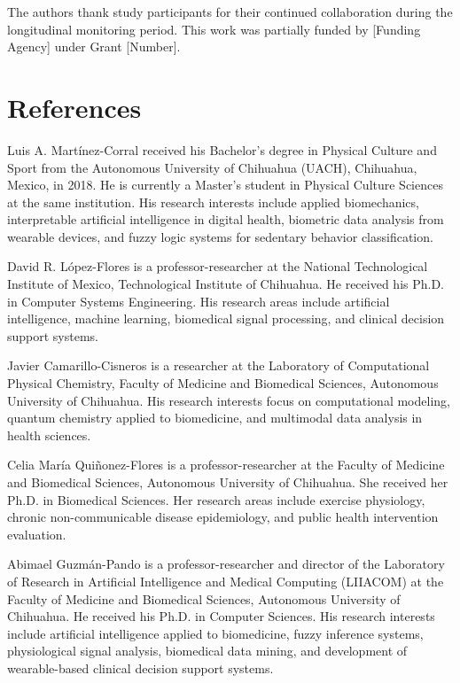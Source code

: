 \documentclass[journal,twoside,web]{ieeecolor}
\begin{document}
The authors thank study participants for their continued collaboration during the longitudinal monitoring period. This work was partially funded by [Funding Agency] under Grant [Number].

\section*{References}




\begin{IEEEbiographynophoto}{Luis A. Martínez-Corral} received his Bachelor's degree in Physical Culture and Sport from the Autonomous University of Chihuahua (UACH), Chihuahua, Mexico, in 2018. He is currently a Master's student in Physical Culture Sciences at the same institution. His research interests include applied biomechanics, interpretable artificial intelligence in digital health, biometric data analysis from wearable devices, and fuzzy logic systems for sedentary behavior classification.
\end{IEEEbiographynophoto}

\begin{IEEEbiographynophoto}{David R. López-Flores} is a professor-researcher at the National Technological Institute of Mexico, Technological Institute of Chihuahua. He received his Ph.D. in Computer Systems Engineering. His research areas include artificial intelligence, machine learning, biomedical signal processing, and clinical decision support systems.
\end{IEEEbiographynophoto}

\begin{IEEEbiographynophoto}{Javier Camarillo-Cisneros} is a researcher at the Laboratory of Computational Physical Chemistry, Faculty of Medicine and Biomedical Sciences, Autonomous University of Chihuahua. His research interests focus on computational modeling, quantum chemistry applied to biomedicine, and multimodal data analysis in health sciences.
\end{IEEEbiographynophoto}

\begin{IEEEbiographynophoto}{Celia María Quiñonez-Flores} is a professor-researcher at the Faculty of Medicine and Biomedical Sciences, Autonomous University of Chihuahua. She received her Ph.D. in Biomedical Sciences. Her research areas include exercise physiology, chronic non-communicable disease epidemiology, and public health intervention evaluation.
\end{IEEEbiographynophoto}

\begin{IEEEbiographynophoto}{Abimael Guzmán-Pando} is a professor-researcher and director of the Laboratory of Research in Artificial Intelligence and Medical Computing (LIIACOM) at the Faculty of Medicine and Biomedical Sciences, Autonomous University of Chihuahua. He received his Ph.D. in Computer Sciences. His research interests include artificial intelligence applied to biomedicine, fuzzy inference systems, physiological signal analysis, biomedical data mining, and development of wearable-based clinical decision support systems.
\end{IEEEbiographynophoto}
\end{document}
